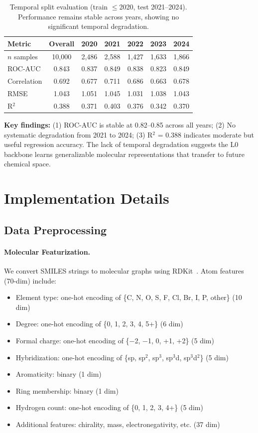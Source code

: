 \documentclass[sigconf]{acmart}
\begin{document}
\begin{table}[h]
\caption{Temporal split evaluation (train $\leq$2020, test 2021--2024). Performance remains stable across years, showing no significant temporal degradation.}
\label{tab:temporal}
\centering
\small
\begin{tabular}{@{}lcccccc@{}}
\toprule
Metric & Overall & 2020 & 2021 & 2022 & 2023 & 2024 \\
\midrule
$n$ samples & 10{,}000 & 2{,}486 & 2{,}588 & 1{,}427 & 1{,}633 & 1{,}866 \\
ROC-AUC & 0.843 & 0.837 & 0.849 & 0.838 & 0.823 & 0.849 \\
Correlation & 0.692 & 0.677 & 0.711 & 0.686 & 0.663 & 0.678 \\
RMSE & 1.043 & 1.051 & 1.045 & 1.031 & 1.038 & 1.043 \\
R$^2$ & 0.388 & 0.371 & 0.403 & 0.376 & 0.342 & 0.370 \\
\bottomrule
\end{tabular}
\end{table}

\textbf{Key findings:} (1) ROC-AUC is stable at 0.82--0.85 across all years; (2) No systematic degradation from 2021 to 2024; (3) R$^2$ = 0.388 indicates moderate but useful regression accuracy. The lack of temporal degradation suggests the L0 backbone learns generalizable molecular representations that transfer to future chemical space.

\section{Implementation Details}
\label{app:implementation}

\subsection{Data Preprocessing}

\paragraph{Molecular Featurization.} We convert SMILES strings to molecular graphs using RDKit~\cite{landrum_rdkit}. Atom features (70-dim) include:
\begin{itemize}[noitemsep]
    \item Element type: one-hot encoding of \{C, N, O, S, F, Cl, Br, I, P, other\} (10 dim)
    \item Degree: one-hot encoding of \{0, 1, 2, 3, 4, 5+\} (6 dim)
    \item Formal charge: one-hot encoding of \{$-$2, $-$1, 0, +1, +2\} (5 dim)
    \item Hybridization: one-hot encoding of \{sp, sp$^2$, sp$^3$, sp$^3$d, sp$^3$d$^2$\} (5 dim)
    \item Aromaticity: binary (1 dim)
    \item Ring membership: binary (1 dim)
    \item Hydrogen count: one-hot encoding of \{0, 1, 2, 3, 4+\} (5 dim)
    \item Additional features: chirality, mass, electronegativity, etc. (37 dim)
\end{itemize}
\end{document}
